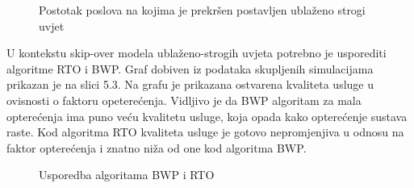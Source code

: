 \documentclass[../zavrsni.tex]{subfiles}
\begin{document}
\begin{figure}[!htb]
    \caption{\label{fig:my-label} Postotak poslova na kojima je prekršen postavljen ublaženo strogi uvjet}
\end{figure}

U kontekstu skip-over modela ublaženo-strogih uvjeta potrebno je usporediti algoritme RTO i BWP. Graf dobiven iz podataka skupljenih simulacijama
prikazan je na slici 5.3. Na grafu je prikazana ostvarena kvaliteta usluge u ovisnosti o faktoru opeterećenja.  
Vidljivo je da BWP algoritam za mala 
opterećenja ima puno veću kvalitetu usluge, koja opada kako opterećenje sustava raste. Kod algoritma RTO kvaliteta usluge je gotovo nepromjenjiva
u odnosu na faktor opterećenja i znatno niža od one kod algoritma BWP. 

\begin{figure}[!htb]
    \caption{\label{fig:my-label} Usporedba algoritama BWP i RTO}
\end{figure}
\end{document}
